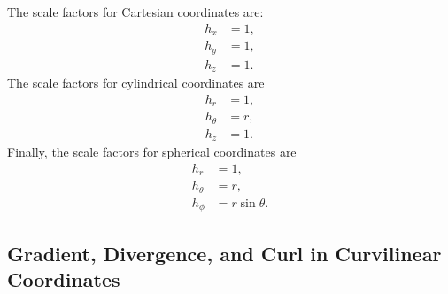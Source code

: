 The scale factors for Cartesian coordinates are:
\begin{subequations}
\begin{align}
  h_x &= 1, \\
  h_y &= 1, \\
  h_z &= 1. 
\end{align}
\end{subequations}
The scale factors for cylindrical coordinates are
\begin{subequations}
\begin{align}
  h_r &= 1, \\
  h_\theta &= r, \\
  h_z &= 1. 
\end{align}
\end{subequations}
Finally, the scale factors for spherical coordinates are
\begin{subequations}
\begin{align}
  h_r &= 1, \\
  h_\theta &= r, \\
  h_\phi &= r \sin \theta. 
\end{align}
\end{subequations}


\subsection{Gradient, Divergence, and Curl in Curvilinear Coordinates}


